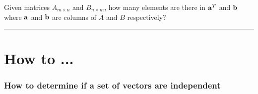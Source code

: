 \begin{questions}
     



 
 

 

 




 
\question Given matrices $A_{m \times n}$ and $B_{n \times m}$, how many elements are there in ${\bf a}^T$ and ${\bf b}$ where ${\bf a}$ and ${\bf b}$ are columns of $A$ and $B$ respectively?





\rule[0.001in]{\textwidth}{0.00025in}


\end{questions}
 
 
 
 \section*{How to ...}
 
 
 
 
 
 
 \subsubsection*{How to determine if a set of vectors are independent}
 

